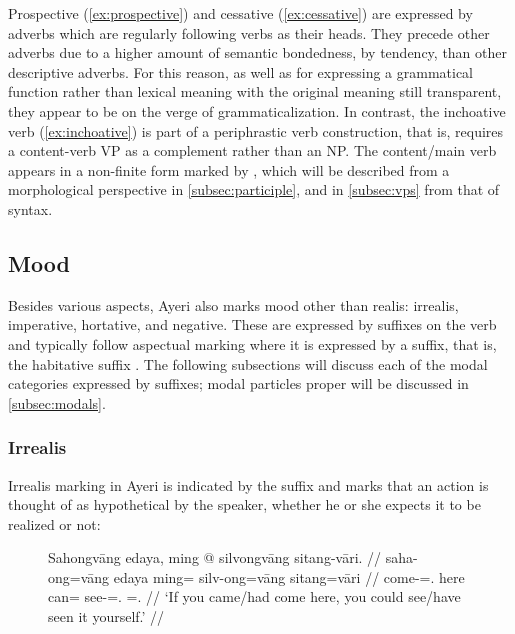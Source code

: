 Prospective  (\ref{ex:prospective}) and cessative
 (\ref{ex:cessative}) are expressed by adverbs which are
regularly following verbs as their heads. They precede other adverbs due to a
higher amount of semantic bondedness, by tendency, than other descriptive
adverbs. For this reason, as well as for expressing a grammatical function
rather than lexical meaning with the original meaning still transparent, they
appear to be on the verge of grammaticalization. In contrast, the inchoative
verb  (\ref{ex:inchoative}) is part of a periphrastic verb
construction, that is,  requires a content-verb VP as a
complement rather than an NP. The content/main verb appears in a non-finite
form marked by , which will be described from a morphological
perspective in \autoref{subsec:participle}, and in \autoref{subsec:vps} from
that of syntax.

\subsection{Mood}
\label{subsec:mood}

Besides various aspects, Ayeri also marks mood other than realis: irrealis,
imperative, hortative, and negative. These are expressed by suffixes on
the verb and typically follow aspectual marking where it is expressed by a
suffix, that is, the habitative suffix . The following
subsections will discuss each of the modal categories expressed by suffixes;
modal particles proper will be discussed in \autoref{subsec:modals}.

\subsubsection{Irrealis}

Irrealis marking in Ayeri is indicated by the suffix  and 
marks that an action is thought of as hypothetical by the speaker, whether he 
or she expects it to be realized or not:

\begin{figure}[h]
\ex\label{ex:irrealis}\begingl
	\gla Sahongvāng edaya, ming @ silvongvāng sitang-vāri. //
	\glb saha-ong=vāng edaya ming= silv-ong=vāng sitang=vāri //
	\glb come-\Irr{}=\Second{}.\Aarg{} here can= see-\Irr{}=\Second{}.\Aarg{} 
		\Refl{}=\Second{}.\Ins{} //
	\glft `If you came/had come here, you could see/have seen it 
		yourself.' //
\endgl\xe
\end{figure}

